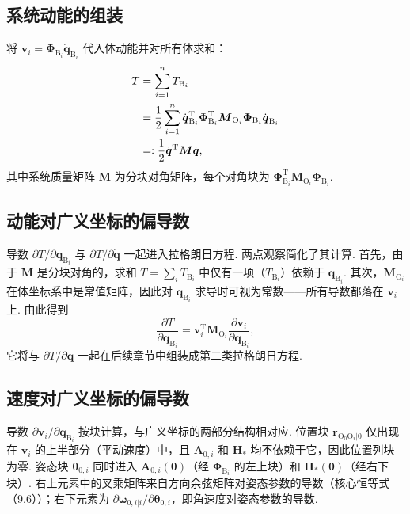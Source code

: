 \subsection{系统动能的组装}
将 $\boldsymbol{v}_i = \boldsymbol{\Phi}_{\text{B}_i} \dot{\boldsymbol{q}}_{\text{B}_i}$ 代入体动能并对所有体求和：
\begin{align*}T &= \sum_{i=1}^{n} T_{\text{B}_i} \notag \\
    &= \frac{1}{2} \sum_{i=1}^{n} \dot{\boldsymbol{q}}_{\text{B}_i}^\text{T} \boldsymbol{\Phi}_{\text{B}_i}^\text{T} \boldsymbol{M}_{\text{O}_i} \boldsymbol{\Phi}_{\text{B}_i} \dot{\boldsymbol{q}}_{\text{B}_i} \notag \\
    &=: \frac{1}{2} \dot{\boldsymbol{q}}^\text{T} \boldsymbol{M} \dot{\boldsymbol{q}},\end{align*}
其中系统质量矩阵 $\boldsymbol{M}$ 为分块对角矩阵，每个对角块为 $\boldsymbol{\Phi}_{\text{B}_i}^\text{T} \boldsymbol{M}_{\text{O}_i} \boldsymbol{\Phi}_{\text{B}_i}$.
\subsection{动能对广义坐标的偏导数}
导数 $\partial T / \partial \boldsymbol{q}_{\text{B}_i}$ 与 $\partial T / \partial \dot{\boldsymbol{q}}$ 一起进入拉格朗日方程. 两点观察简化了其计算. 首先，由于 $\boldsymbol{M}$ 是分块对角的，求和 $T = \sum_i T_{\text{B}_i}$ 中仅有一项（$T_{\text{B}_i}$）依赖于 $\boldsymbol{q}_{\text{B}_i}$. 其次，$\boldsymbol{M}_{\text{O}_i}$ 在体坐标系中是常值矩阵，因此对 $\boldsymbol{q}_{\text{B}_i}$ 求导时可视为常数——所有导数都落在 $\boldsymbol{v}_i$ 上. 由此得到
\[
\frac{\partial T}{\partial \boldsymbol{q}_{\text{B}_i}} = \boldsymbol{v}_i^\text{T} \boldsymbol{M}_{\text{O}_i} \frac{\partial \boldsymbol{v}_i}{\partial \boldsymbol{q}_{\text{B}_i}},
\]
它将与 $\partial T / \partial \dot{\boldsymbol{q}}$ 一起在后续章节中组装成第二类拉格朗日方程.
\subsection{速度对广义坐标的偏导数}
导数 $\partial \boldsymbol{v}_i / \partial \boldsymbol{q}_{\text{B}_i}$ 按块计算，与广义坐标的两部分结构相对应. 位置块 $\boldsymbol{r}_{\text{O}_0\text{O}_i|0}$ 仅出现在 $\boldsymbol{v}_i$ 的上半部分（平动速度）中，且 $\boldsymbol{A}_{0,i}$ 和 $\boldsymbol{H}_*$ 均不依赖于它，因此位置列块为零. 姿态块 $\boldsymbol{\theta}_{0,i}$ 同时进入 $\boldsymbol{A}_{0,i}(\boldsymbol{\theta})$（经 $\boldsymbol{\Phi}_{\text{B}_i}$ 的左上块）和 $\boldsymbol{H}_*(\boldsymbol{\theta})$（经右下块）. 右上元素中的叉乘矩阵来自方向余弦矩阵对姿态参数的导数（核心恒等式 （9.6））；右下元素为 $\partial \boldsymbol{\omega}_{0,i|i} / \partial \boldsymbol{\theta}_{0,i}$，即角速度对姿态参数的导数.
